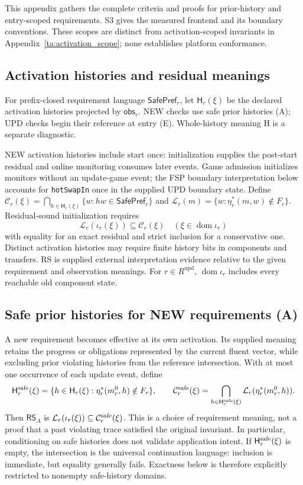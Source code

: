 This appendix gathers the complete criteria and proofs for prior-history and entry-scoped requirements. S3 gives the measured frontend and its boundary conventions. These scopes are distinct from activation-scoped invariants in Appendix~\ref{ta:activation_scope}; none establishes platform conformance.

\subsection{Activation histories and residual meanings}
For prefix-closed requirement language $\mathsf{SafePref}_r$, let $\mathsf H_r(\xi)$ be the declared activation histories projected by $\mathsf{obs}_r$. NEW checks use safe prior histories (A); UPD checks begin their reference at entry (E). Whole-history meaning H is a separate diagnostic.

NEW activation histories include start once: initialization supplies the post-start residual and online monitoring consumes later events. Game admission initializes monitors without an update-game event; the FSP boundary interpretation below accounts for \texttt{hotSwapIn} once in the supplied UPD boundary state. Define $\mathcal C_r(\xi)=\bigcap_{h\in\mathsf H_r(\xi)}\{w:hw\in\mathsf{SafePref}_r\}$ and $\mathcal L_r(m)=\{w:\eta_r^*(m,w)\notin F_r\}$. Residual-sound initialization requires
  \[
    \mathcal L_r(\iota_r(\xi))\subseteq\mathcal C_r(\xi)
    \quad(\xi\in\operatorname{dom}\iota_r)
    \tag{RS}
  \]
with equality for an exact residual and strict inclusion for a conservative one. Distinct activation histories may require finite history bits in components and transfers. RS is supplied external interpretation evidence relative to the given requirement and observation meanings. For $r\in R^{\mathrm{upd}}$, $\operatorname{dom}\iota_r$ includes every reachable old component state.


\subsection{Safe prior histories for NEW requirements (A)}
A new requirement becomes effective at its own activation. Its supplied meaning retains the progress or obligations represented by the current fluent vector, while excluding prior violating histories from the reference intersection. With at most one occurrence of each update event, define
\[
 \mathsf H_r^{\rm safe}(\xi)=\{h\in\mathsf H_r(\xi):
    \eta_r^*(m_r^0,h)\notin F_r\},\qquad
 \mathcal C_r^{\rm safe}(\xi)=\bigcap_{h\in\mathsf H_r^{\rm safe}(\xi)}
    \mathcal L_r(\eta_r^*(m_r^0,h)).
\]
Then $\mathsf{RS}_A$ is $\mathcal L_r(\iota_r(\xi))\subseteq\mathcal C_r^{\rm safe}(\xi)$.
This is a choice of requirement meaning, not a proof that a past violating trace satisfied the original invariant. In particular, conditioning on safe histories does not validate application intent. If $\mathsf H_r^{\rm safe}(\xi)$ is empty, the intersection is the universal continuation language: inclusion is immediate, but equality generally fails. Exactness below is therefore explicitly restricted to nonempty safe-history domains.

